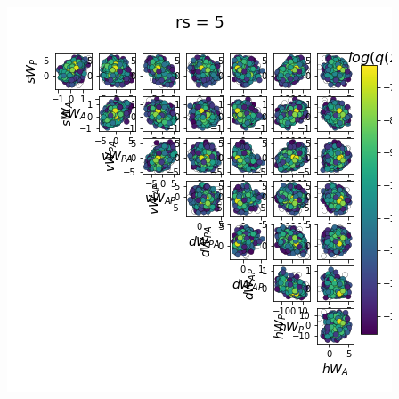 \documentclass[11pt]{article}
\begin{document}
\begin{center}
\includegraphics[scale=0.33]{figs/Z_SC_full_c=0_p=50_rs=5.png}
\end{center}
\end{document}
